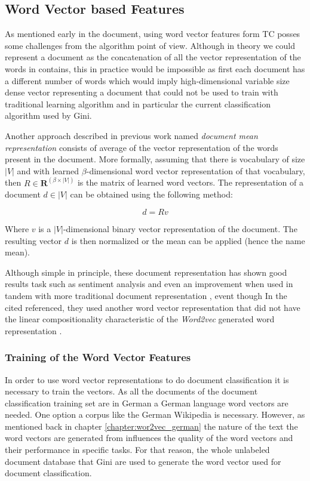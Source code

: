 \subsection{Word Vector  based Features}
\label{sec:sub_w2v4tc_w2v_based_features}

As mentioned early in the document, using word vector features form \ac{TC}
posses some challenges from the algorithm point of view. Although in theory
we could represent a document as the concatenation of all the vector
representation of the words in contains, this in practice would be impossible
as first each document has a different number of words which would imply
high-dimensional variable size dense vector representing a document that
could not be used to train with traditional learning algorithm and in
particular the current classification algorithm used by Gini.

Another approach described in previous work named \textit{document mean
  representation} consists of average of the vector representation of the  words
present in the document.  More formally, assuming that there is  vocabulary of
size $|V|$ and with learned $\beta$-dimensional word vector representation of
that vocabulary, then  $R  \in \mathbf{R}^{(\beta \times |V|)}$  is  the
matrix of learned word vectors.  The representation of a document $d \in |V|$ can be obtained using the following method:

$$d = Rv$$

Where $v$ is a $|V|$-dimensional  binary vector representation of the
document.   The resulting vector $d$ is then  normalized or the mean can be
applied (hence the name mean).


Although simple in principle, these document representation has  shown good
results task such as sentiment analysis and even an improvement when used in tandem
with more traditional document representation  \cite{maas2010probabilistic},
event though In the cited referenced, they used another word vector representation that
did not have the linear compositionality characteristic of the
\textit{Word2vec} generated word representation \cite{MikolovSCCD13}.


\subsubsection{Training of the Word Vector Features}
\label{sec:sub_w2v_4tc_training-word-vector}
In order to use word vector representations to do document classification it is necessary to train the
vectors.  As all the documents of the document classification training set are
in German a German language word vectors are needed.  One option a
corpus like the German Wikipedia is necessary. However, as mentioned back in
chapter \ref{chapter:wor2vec_german} the nature of the text the word vectors
are generated from influences the quality of the word vectors and their
performance in specific tasks. For that reason, the whole unlabeled document
database that  Gini are used to generate the word vector used for document
classification. 

